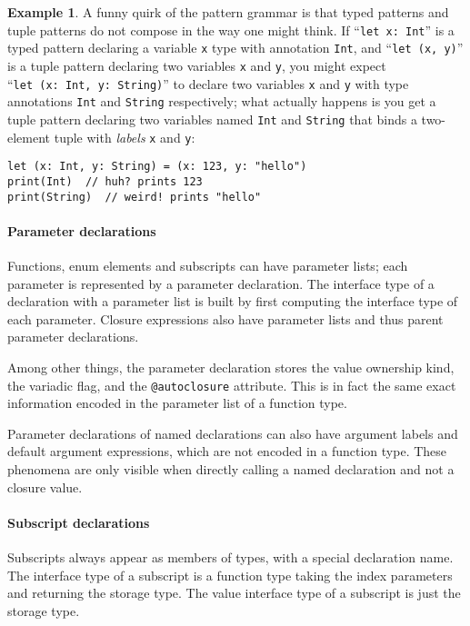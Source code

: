 \documentclass[a4paper,headsepline,bibliography=totoc,toc=flat,fleqn,twoside=semi]{scrbook}
\theoremstyle{definition}
\theoremstyle{definition}
\newtheorem{example}{Example}[chapter]
\theoremstyle{definition}
\begin{document}
\begin{example}
A funny quirk of the pattern grammar is that typed patterns and tuple patterns do not compose in the way one might think. If ``\texttt{let x:~Int}'' is a typed pattern declaring a variable \texttt{x} type with annotation \texttt{Int}, and ``\texttt{let (x, y)}'' is a tuple pattern declaring two variables \texttt{x} and \texttt{y}, you might expect ``\texttt{let~(x:~Int,~y:~String)}'' to declare two variables \texttt{x} and \texttt{y} with type annotations \texttt{Int} and \texttt{String} respectively; what actually happens is you get a tuple pattern declaring two variables named \texttt{Int} and \texttt{String} that binds a two-element tuple with \emph{labels} \texttt{x} and \texttt{y}:
\begin{Verbatim}
let (x: Int, y: String) = (x: 123, y: "hello")
print(Int)  // huh? prints 123
print(String)  // weird! prints "hello"
\end{Verbatim}
\end{example}

\paragraph{Parameter declarations} Functions, enum elements and subscripts can have parameter lists; each parameter is represented by a parameter declaration. The interface type of a declaration with a parameter list is built by first computing the interface type of each parameter. Closure expressions also have parameter lists and thus parent parameter declarations.

Among other things, the parameter declaration stores the value ownership kind, the variadic flag, and the \texttt{@autoclosure} attribute. This is in fact the same exact information encoded in the parameter list of a function type.

Parameter declarations of named declarations can also have argument labels and default argument expressions, which are not encoded in a function type. These phenomena are only visible when directly calling a named declaration and not a closure value.

\paragraph{Subscript declarations} Subscripts always appear as members of types, with a special declaration name. The interface type of a subscript is a function type taking the index parameters and returning the storage type. The value interface type of a subscript is just the storage type.
\end{document}
